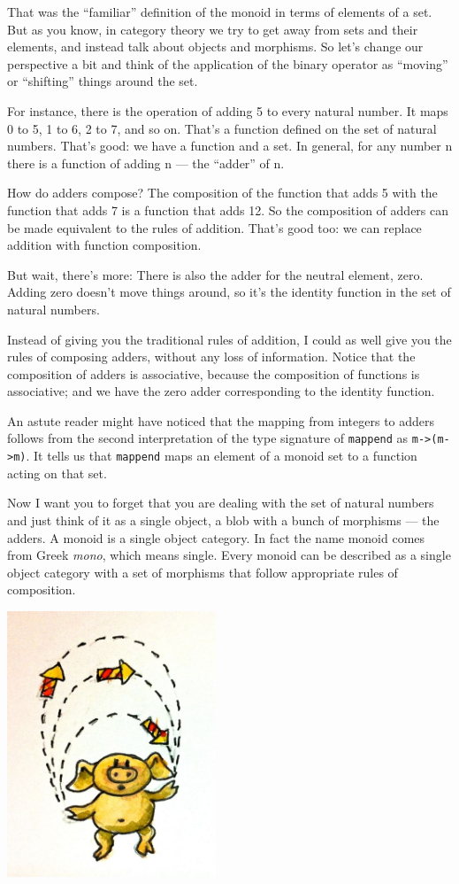 That was the ``familiar'' definition of the monoid in terms of elements
of a set. But as you know, in category theory we try to get away from
sets and their elements, and instead talk about objects and morphisms.
So let's change our perspective a bit and think of the application of
the binary operator as ``moving'' or ``shifting'' things around the set.

For instance, there is the operation of adding 5 to every natural
number. It maps 0 to 5, 1 to 6, 2 to 7, and so on. That's a function
defined on the set of natural numbers. That's good: we have a function
and a set. In general, for any number n there is a function of adding n
--- the ``adder'' of n.

How do adders compose? The composition of the function that adds 5 with
the function that adds 7 is a function that adds 12. So the composition
of adders can be made equivalent to the rules of addition. That's good
too: we can replace addition with function composition.

But wait, there's more: There is also the adder for the neutral element,
zero. Adding zero doesn't move things around, so it's the identity
function in the set of natural numbers.

Instead of giving you the traditional rules of addition, I could as well
give you the rules of composing adders, without any loss of information.
Notice that the composition of adders is associative, because the
composition of functions is associative; and we have the zero adder
corresponding to the identity function.

An astute reader might have noticed that the mapping from integers to
adders follows from the second interpretation of the type signature of
\texttt{mappend} as \texttt{m-\textgreater{}(m-\textgreater{}m)}. It
tells us that \texttt{mappend} maps an element of a monoid set to a
function acting on that set.

Now I want you to forget that you are dealing with the set of natural
numbers and just think of it as a single object, a blob with a bunch of
morphisms --- the adders. A monoid is a single object category. In fact
the name monoid comes from Greek \emph{mono}, which means single. Every
monoid can be described as a single object category with a set of
morphisms that follow appropriate rules of composition.

\includegraphics[width=2.45833in]{images/monoid.jpg}

